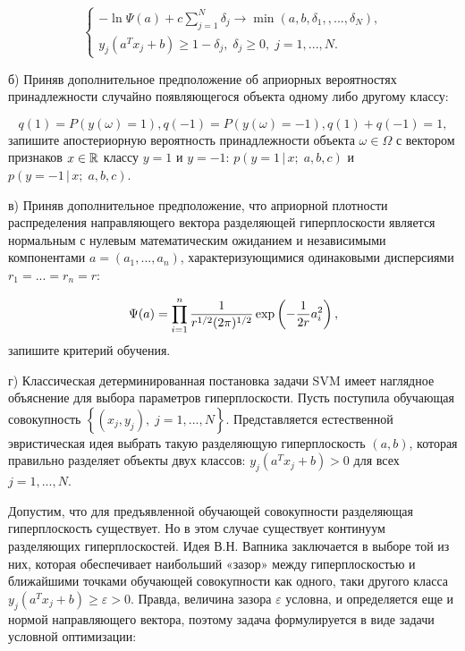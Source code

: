 \begin{problem}
\[\left\{\begin{array}{l} {-\ln \Psi (a)+c\sum _{j=1}^{N}\delta _{j}  \to \min (a,b,\delta _{1} ,,...,\delta _{N} ),} \\ {y_{j} (a^{T} x_{j} +b)\ge 1-\delta _{j} ,\; \delta _{j} \ge 0,\; j=1,...,N.} \end{array}\right. \] 

б) Приняв дополнительное предположение об априорных вероятностях принадлежности случайно появляющегося объекта одному либо другому классу: 

\[q(1)=P\left(y(\omega )=1\right), q(-1)=P\left(y(\omega )=-1\right), q(1)+q(-1)=1, \] 
запишите апостериорную вероятность принадлежности объекта $\omega \in \Omega $ с вектором признаков $x\in {\rm {\mathbb R}}$ классу $y=1$ и $y=-1$: $p(y=1\, |\, x;\; a,b,c)$ и $p(y=-1\, |\, x;\; a,b,c)$.

в) Приняв дополнительное предположение, что априорной плотности распределения направляющего вектора разделяющей гиперплоскости является нормальным с нулевым математическим ожиданием и независимыми компонентами $a=(a_{1} ,...,a_{n} )$, характеризующимися одинаковыми дисперсиями $r_{1} =...=r_{n} =r$: 

\[\Psi (a)=\prod _{i=1}^{n}\frac{1}{r^{{1\mathord{\left/ {\vphantom {1 2}} \right. \kern-\nulldelimiterspace} 2} } (2\pi )^{{1\mathord{\left/ {\vphantom {1 2}} \right. \kern-\nulldelimiterspace} 2} } } \exp \left(-\frac{1}{2r} a_{i}^{2} \right),\] 
запишите критерий обучения.

г) Классическая детерминированная постановка задачи SVM имеет наглядное объяснение для выбора параметров гиперплоскости. Пусть поступила обучающая совокупность $\left\{(x_{j} ,y_{j} ),\; j=1,...,N\right\}$. Представляется естественной эвристическая идея выбрать такую разделяющую гиперплоскость $(a,b)$, которая правильно разделяет объекты двух классов: $y_{j} (a^{T} x_{j} +b)>0$ для всех $j=1,...,N$. 

Допустим, что для предъявленной обучающей совокупности разделяющая гиперплоскость существует. Но в этом случае существует континуум разделяющих гиперплоскостей. Идея В.Н. Вапника заключается в выборе той из них, которая обеспечивает наибольший «зазор» между гиперплоскостью и ближайшими точками обучающей совокупности как одного, таки другого класса $y_{j} (a^{T} x_{j} +b)\ge \varepsilon >0$. Правда, величина зазора $\varepsilon $ условна, и определяется еще и нормой направляющего вектора, поэтому задача формулируется в виде задачи условной оптимизации: 


\end{problem}
